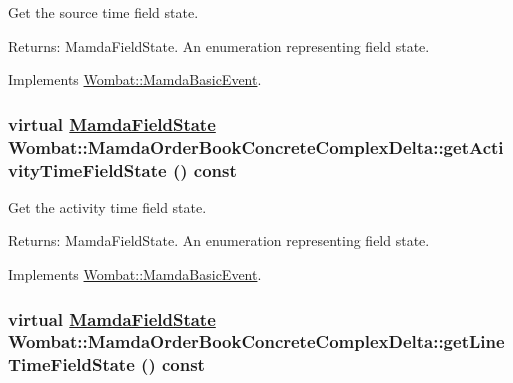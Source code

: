 Get the source time field state. 

\begin{Desc}
\item[Returns:]Mamda\-Field\-State. An enumeration representing field state. \end{Desc}


Implements \hyperlink{classWombat_1_1MamdaBasicEvent_9cd58f3d7b5ebea42fa86e5dde46ab18}{Wombat::Mamda\-Basic\-Event}.\hypertarget{classWombat_1_1MamdaOrderBookConcreteComplexDelta_907b71fab386608f4eb1e3de60b15b72}{
\subsubsection[getActivityTimeFieldState]{\setlength{\rightskip}{0pt plus 5cm}virtual \hyperlink{namespaceWombat_93aac974f2ab713554fd12a1fa3b7d2a}{Mamda\-Field\-State} Wombat::Mamda\-Order\-Book\-Concrete\-Complex\-Delta::get\-Activity\-Time\-Field\-State () const}}
\label{classWombat_1_1MamdaOrderBookConcreteComplexDelta_907b71fab386608f4eb1e3de60b15b72}


Get the activity time field state. 

\begin{Desc}
\item[Returns:]Mamda\-Field\-State. An enumeration representing field state. \end{Desc}


Implements \hyperlink{classWombat_1_1MamdaBasicEvent_a61a566e3442181ca1fadc4524296cd0}{Wombat::Mamda\-Basic\-Event}.\hypertarget{classWombat_1_1MamdaOrderBookConcreteComplexDelta_9ef0367548a6c0f08db939e578cdf8b9}{
\subsubsection[getLineTimeFieldState]{\setlength{\rightskip}{0pt plus 5cm}virtual \hyperlink{namespaceWombat_93aac974f2ab713554fd12a1fa3b7d2a}{Mamda\-Field\-State} Wombat::Mamda\-Order\-Book\-Concrete\-Complex\-Delta::get\-Line\-Time\-Field\-State () const}}
\label{classWombat_1_1MamdaOrderBookConcreteComplexDelta_9ef0367548a6c0f08db939e578cdf8b9}


